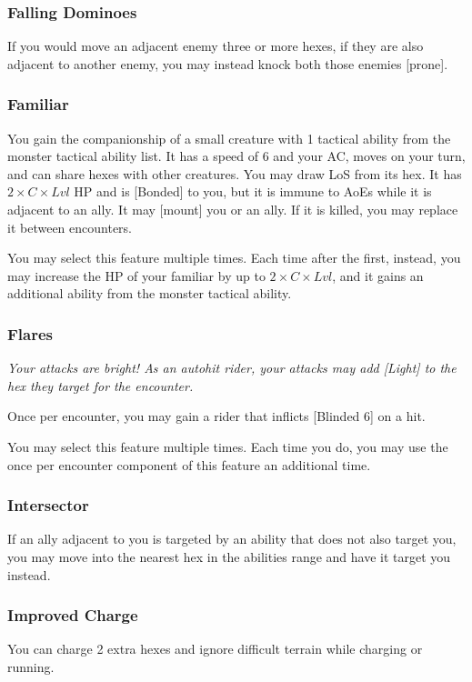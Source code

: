 \begin{multicols*}{2}
\subsubsection{Falling Dominoes}
If you would move an adjacent enemy three or more hexes, if they are also adjacent to another enemy, you may instead knock both those enemies [prone].

\subsubsection{Familiar}
You gain the companionship of a small creature with 1 tactical ability from the monster tactical ability list. It has a speed of 6 and your AC, moves on your turn, and can share hexes with other creatures. You may draw LoS from its hex. It has $2\times C\times Lvl$ HP and is [Bonded] to you, but it is immune to AoEs while it is adjacent to an ally. It may [mount] you or an ally. If it is killed, you may replace it between encounters.

You may select this feature multiple times. Each time after the first, instead, you may increase the HP of your familiar by up to $2\times C\times Lvl$, and it gains an additional ability from the monster tactical ability.

\subsubsection{Flares \R }
\emph{Your attacks are bright! As an autohit rider, your attacks may add [Light] to the hex they target for the encounter.}

Once per encounter, you may gain a rider that inflicts [Blinded 6] on a hit.

You may select this feature multiple times. Each time you do, you may use the once per encounter component of this feature an additional time.

\subsubsection{Intersector}
If an ally adjacent to you is targeted by an ability that does not also target you, you may move into the nearest hex in the abilities range and have it target you instead.

\subsubsection{Improved Charge}
You can charge 2 extra hexes and ignore difficult terrain while charging or running.


\end{multicols*}
